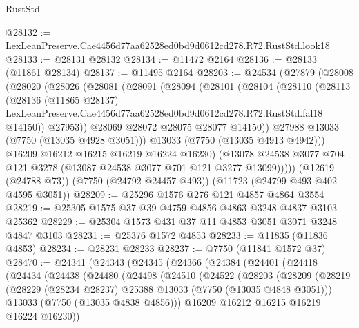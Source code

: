\begin{lexlean}{RustStd}
\begin{coremodule}
@28132 := LexLeanPreserve.Cae4456d77aa62528ed0bd9d0612cd278.R72.RustStd.look18
@28133 := @28131 @28132
@28134 := @11472 @2164
@28136 := @28133 (@11861 @28134)
@28137 := @11495 @2164
@28203 := @24534
    (@27879
      (@28008
        (@28020
          (@28026
            (@28081
              (@28091
                (@28094
                  (@28101
                    (@28104
                      (@28110
                        (@28113
                          (@28136
                            (@11865 @28137)
                            LexLeanPreserve.Cae4456d77aa62528ed0bd9d0612cd278.R72.RustStd.fal18
                            @14150))
                        @27953))
                    @28069
                    @28072
                    @28075
                    @28077
                    @14150))
                @27988
                @13033
                (@7750 (@13035 @4928 @3051)))
              @13033
              (@7750 (@13035 @4913 @4942)))
            @16209
            @16212
            @16215
            @16219
            @16224
            @16230)
          (@13078 @24538 @3077 @704 @121 @3278 (@13087 @24538 @3077 @701 @121 @3277 @13099)))))
    (@12619 (@24788 @73))
    (@7750 (@24792 @24457 @493))
    (@11723 (@24799 @493 @402 @4595 @3051))
@28209 := @25296 @1576 @276 @121 @4857 @4864 @3554
@28219 := @25305 @1575 @37 @39 @4759 @4856 @4863 @3248 @4837 @3103 @25362
@28229 := @25304 @1573 @431 @37 @11 @4853 @3051 @3071 @3248 @4847 @3103
@28231 := @25376 @1572 @4853
@28233 := @11835 (@11836 @4853)
@28234 := @28231 @28233
@28237 := @7750 (@11841 @1572 @37)
@28470 := @24341
    (@24343
      (@24345
        (@24366
          (@24384
            (@24401
              (@24418
                (@24434
                  (@24438
                    (@24480
                      (@24498
                        (@24510
                          (@24522
                            (@28203
                              (@28209
                                (@28219
                                  (@28229
                                    (@28234 @28237)
                                    @25388
                                    @13033
                                    (@7750 (@13035 @4848 @3051)))
                                  @13033
                                  (@7750 (@13035 @4838 @4856)))
                                @16209
                                @16212
                                @16215
                                @16219
                                @16224
                                @16230))

\end{coremodule}
\end{lexlean}
